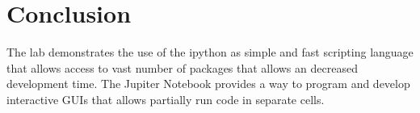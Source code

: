 \section{Conclusion}\label{sec: Conclusion}
The lab demonstrates the use of the ipython as simple and fast scripting language that allows access to vast number of packages that allows an decreased development time. The Jupiter Notebook provides a way to program and develop interactive GUIs that allows partially run code in separate cells.

